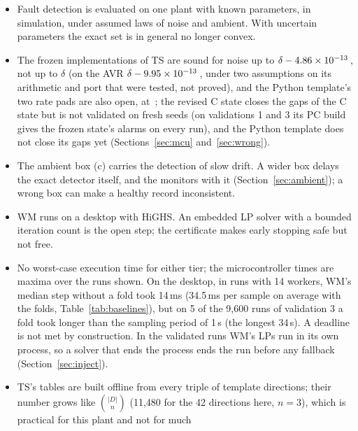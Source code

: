 \begin{itemize}
\item Fault detection is evaluated on one plant with known parameters, in simulation, under assumed laws of noise and ambient. With uncertain
  parameters the exact set is in general no longer convex.
\item The frozen implementations of TS are sound for noise up to $\delta - 4.86\times10^{-13}$\,\degC, not up to
  $\delta$ (on the AVR $\delta - 9.95\times10^{-13}$\,\degC, under two assumptions on its arithmetic and port that were
  tested, not proved), and the Python template's two rate pads are also open, at \,\degC; the revised C
  state closes the gaps of the C state but is not validated on fresh seeds (on validations 1 and 3 its PC build gives
  the frozen state's alarms on every run), and the Python template does not close its
  gaps yet (Sections~\ref{sec:mcu} and~\ref{sec:wrong}).
\item The ambient box (c) carries the detection of slow drift. A wider box delays the exact detector itself, and the
  monitors with it (Section~\ref{sec:ambient}); a wrong box can make a healthy record inconsistent.
\item WM runs on a desktop with HiGHS. An embedded LP solver with a bounded iteration count is the open step; the
  certificate makes early stopping safe but not free.
\item No worst-case execution time for either tier; the microcontroller times are maxima over the runs shown. On
  the desktop, in runs with 14 workers, WM's median step without a fold took 14\,ms (34.5\,ms per sample on average with
  the folds, Table~\ref{tab:baselines}), but on 5 of the 9,600 runs of validation 3 a fold
  took longer than the sampling period of 1\,s (the longest 34\,s). A deadline is not met by construction. In the
  validated runs WM's LPs run in its own process, so a solver that ends the process ends the run before any fallback
  (Section~\ref{sec:inject}).
\item TS's tables are built offline from every triple of template directions; their number grows like
  $\binom{|D|}{n}$ (11,480 for the 42 directions here, $n = 3$), which is practical for this plant and not for much

\end{itemize}
